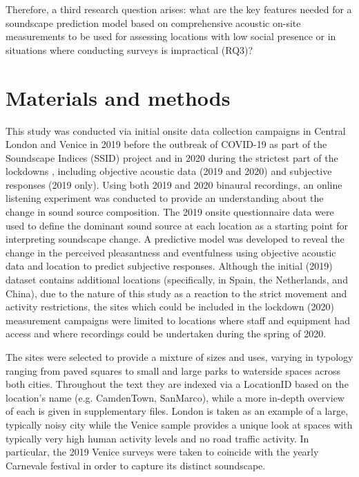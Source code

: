 Therefore, a third research question arises: what are the key features needed for a soundscape prediction model based on comprehensive acoustic on-site measurements to be used for assessing locations with low social presence or in situations where conducting surveys is impractical (RQ3)?

\section{Materials and methods}

This study was conducted via initial onsite data collection campaigns in Central London and Venice in 2019 before the outbreak of COVID-19 as part of the Soundscape Indices (SSID) project \citep{mitchell_soundscape_2020} and in 2020 during the strictest part of the lockdowns \citep{aletta_assessing_2020}, including objective acoustic data (2019 and 2020) and subjective responses (2019 only). Using both 2019 and 2020 binaural recordings, an online listening experiment was conducted to provide an understanding about the change in sound source composition. The 2019 onsite questionnaire data were used to define the dominant sound source at each location as a starting point for interpreting soundscape change. A predictive model was developed to reveal the change in the perceived pleasantness and eventfulness using objective acoustic data and location to predict subjective responses. Although the initial (2019) dataset contains additional locations (specifically, in Spain, the Netherlands, and China), due to the nature of this study as a reaction to the strict movement and activity restrictions, the sites which could be included in the lockdown (2020) measurement campaigns were limited to locations where staff and equipment had access and where recordings could be undertaken during the spring of 2020. 

The sites were selected to provide a mixture of sizes and uses, varying in typology ranging from paved squares to small and large parks to waterside spaces across both cities. Throughout the text they are indexed via a LocationID based on the location's name (e.g. CamdenTown, SanMarco), while a more in-depth overview of each is given in supplementary files. London is taken as an example of a large, typically noisy city while the Venice sample provides a unique look at spaces with typically very high human activity levels and no road traffic activity. In particular, the 2019 Venice surveys were taken to coincide with the yearly Carnevale festival in order to capture its distinct soundscape.

